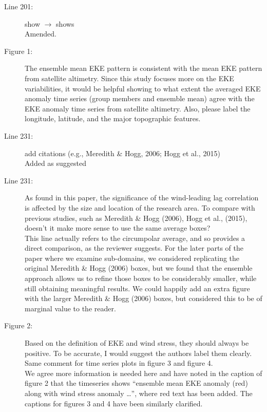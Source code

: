 \documentclass[11pt]{article}
\begin{document}
{\begin{description}
\item[Line 201:] show $\to$ shows\\
{\color{black} Amended. }

\item[Figure 1:] The ensemble mean EKE pattern is consistent with the mean EKE pattern from satellite altimetry. Since this study focuses more on the EKE variabilities, it would be helpful showing to what extent the averaged EKE anomaly time series (group members and ensemble mean) agree with the EKE anomaly time series from satellite altimetry. Also, please label the longitude, latitude, and the major topographic features. \\
{\color{black}  }

\item[Line 231:] add citations (e.g., Meredith \& Hogg, 2006; Hogg et al., 2015) \\
{\color{black} Added as suggested }

\item[Line 231:] As found in this paper, the significance of the wind-leading lag correlation is affected by the size and location of the research area. To compare with previous studies, such as Meredith \& Hogg (2006), Hogg et al., (2015), doesn't it make more sense to use the same average boxes? \\
{\color{black} This line actually refers to the circumpolar average, and so provides a direct comparison, as the reviewer suggests.  
For the later parts of the paper where we examine sub-domains, we considered replicating the original Meredith \& Hogg (2006) boxes, but we found that the ensemble approach allows us to refine those boxes to be considerably smaller, while still obtaining meaningful results.
We could happily add an extra figure with the larger Meredith \& Hogg (2006) boxes, but considered this to be of marginal value to the reader.}

\item[Figure 2:] Based on the definition of EKE and wind stress, they should always be positive. To be accurate, I would suggest the authors label them clearly. Same comment for time series plots in figure 3 and figure 4. \\
{\color{black} We agree more information is needed here and  have noted in the caption of figure 2 that the timeseries shows ``ensemble mean {\color{red}EKE anomaly} (red) along with wind stress {\color{red}anomaly} \ldots'', where red text has been added. 
The captions for figures 3 and 4 have been similarly clarified.}


\end{description}}
\end{document}
